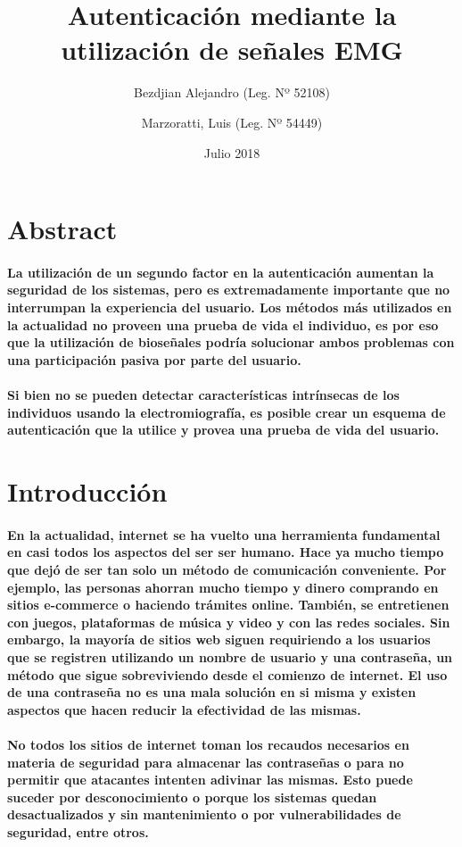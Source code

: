 \documentclass{article}
\title{Autenticación mediante la utilización de señales EMG}
\author{
    Bezdjian Alejandro (Leg. Nº 52108) \\
    \and
    Marzoratti, Luis (Leg. Nº 54449)
}
\date{Julio 2018}
\begin{document}
\maketitle
\thispagestyle{empty}
\clearpage
\tableofcontents
\clearpage

\section{Abstract}
\paragraph{
La utilización de un segundo factor en la autenticación aumentan la seguridad de los sistemas, pero es extremadamente importante que no interrumpan la experiencia del usuario. Los métodos más utilizados en la actualidad no proveen una prueba de vida el individuo, es por eso que la utilización de bioseñales podría solucionar ambos problemas con una participación pasiva por parte del usuario.
}
\paragraph{
Si bien no se pueden detectar características intrínsecas de los individuos usando la electromiografía, es posible crear un esquema de autenticación que la utilice y provea una prueba de vida del usuario.
}

\section{Introducción}
\paragraph{
En la actualidad, internet se ha vuelto una herramienta fundamental en casi todos los aspectos del ser ser humano. Hace ya mucho tiempo que dejó de ser tan solo un método de comunicación conveniente. Por ejemplo, las personas ahorran mucho tiempo y dinero comprando en sitios e-commerce o haciendo trámites online. También, se entretienen con juegos, plataformas de música y video y con las redes sociales. Sin embargo, la mayoría de sitios web siguen requiriendo a los usuarios que se registren utilizando un nombre de usuario y una contraseña, un método que sigue sobreviviendo desde el comienzo de internet. El uso de una contraseña no es una mala solución en si misma y existen aspectos que hacen reducir la efectividad de las mismas.
}
\paragraph{
 No todos los sitios de internet toman los recaudos necesarios en materia de seguridad para almacenar las contraseñas o para no permitir que atacantes intenten adivinar las mismas. Esto puede suceder por desconocimiento o porque los sistemas quedan desactualizados y sin mantenimiento o por vulnerabilidades de seguridad, entre otros.
}
\end{document}
